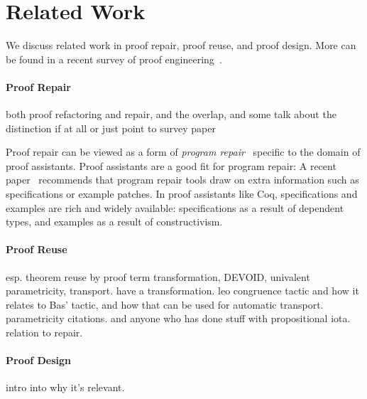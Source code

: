 \section{Related Work}


We discuss related work in proof repair, proof reuse, and proof design.
More can be found in a recent survey of proof engineering~\cite{PGL-045}.

\paragraph{Proof Repair}

both proof refactoring and repair, and the overlap, and some talk about the distinction if at all or just point to survey paper~\cite{wibergh2019, WhitesidePhD, Dietrich2013, adams2015, Bourke12, Roe2016, robert2018, pumpkinpatch}

Proof repair can be viewed as a form of \textit{program repair}~\cite{Monperrus:2018:ASR:3177787.3105906, Gazzola:2018:ASR:3180155.3182526}
specific to the domain of proof assistants.
Proof assistants are a good fit for program repair: A recent paper~\cite{Qi:2015:APP:2771783.2771791} 
recommends that program repair tools draw on extra information
such as specifications or example patches. In proof assistants like Coq, specifications and examples 
are rich and widely available: specifications as a result of dependent types,
and examples as a result of constructivism.

\paragraph{Proof Reuse}

esp. theorem reuse by proof term transformation, DEVOID, univalent parametricity, transport. \cite{magaud2000changing} have a transformation.
leo congruence tactic and how it relates to Bas' tactic, and how that can be used for automatic transport.
parametricity citations. and anyone who has done stuff with propositional iota.
relation to repair.

\paragraph{Proof Design}

intro into why it's relevant.

